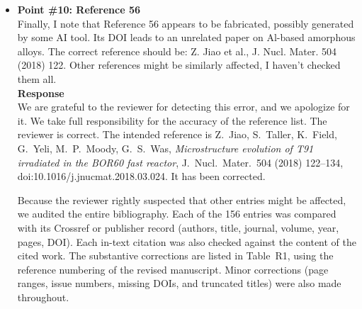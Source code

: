\documentclass{article}
\newif\ifshowauthornotes
\newcommand{\authornote}[1]{\ifshowauthornotes{\color{red}\ [\textbf{Author action:} #1]}\fi}
\begin{document}
\begin{itemize}
\item \textbf{Point \#10: Reference 56}\\
Finally, I note that Reference 56 appears to be fabricated, possibly generated by some AI tool. Its DOI leads to an unrelated paper on Al-based amorphous alloys. The correct reference should be: Z. Jiao et al., J. Nucl. Mater. 504 (2018) 122. Other references might be similarly affected, I haven't checked them all.\\

\textbf{Response}\\
We are grateful to the reviewer for detecting this error, and we apologize for it. We take full responsibility for the accuracy of the reference list. The reviewer is correct. The intended reference is Z.~Jiao, S.~Taller, K.~Field, G.~Yeli, M.~P.~Moody, G.~S.~Was, \emph{Microstructure evolution of T91 irradiated in the BOR60 fast reactor}, J.~Nucl.\ Mater.\ 504 (2018) 122--134, doi:10.1016/j.jnucmat.2018.03.024. It has been corrected.

\authornote{Decide whether to state how the erroneous entries arose (the manuscript's Declarations already disclose AI assistance in literature research). A brief, candid sentence is generally received better than silence.}

Because the reviewer rightly suspected that other entries might be affected, we audited the entire bibliography. Each of the 156 entries was compared with its Crossref or publisher record (authors, title, journal, volume, year, pages, DOI). Each in-text citation was also checked against the content of the cited work. The substantive corrections are listed in Table~R1, using the reference numbering of the revised manuscript. Minor corrections (page ranges, issue numbers, missing DOIs, and truncated titles) were also made throughout.

\authornote{IMPORTANT: The file resubmission/Generalized\_Cluster\_Dynamics.pdf dated September 17, 2026 still contains all of the errors listed in Table~R1 (e.g., [88] still carries the wrong authors and the amorphous-alloy DOI flagged by this reviewer, and [30], [32]--[34] are still present). Make every correction in ClusterDynamicsRefs.bib and the .tex citations before resubmitting, then delete this note.}


\end{itemize}
\end{document}
